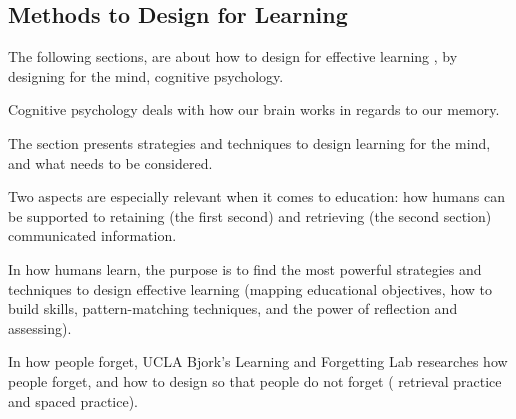 \subsection{Methods to Design for Learning}


The following sections, are about how to design for effective learning \citep{dirksen}, by designing for the mind, cognitive psychology. %

Cognitive psychology deals with how our brain works in regards to our memory.

The section presents strategies and techniques to design learning for the mind, and what needs to be considered.

Two aspects are especially relevant when it comes to education: how humans can be supported to retaining (the first second) and retrieving (the second section) communicated information.

In how humans learn, the purpose is to find the most powerful strategies and techniques to design effective learning (mapping educational objectives, how to build skills, pattern-matching techniques, and the power of reflection and assessing).

In how people forget, UCLA Bjork's Learning and Forgetting Lab \citep{bjork} researches how people forget, and how to design so that people do not forget ( retrieval practice and spaced practice).




